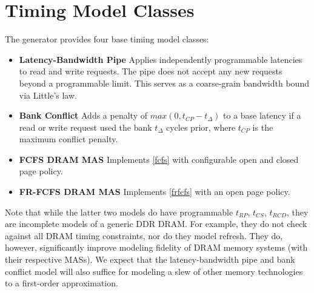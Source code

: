 \section{Timing Model Classes}\label{sec:timing_model}

The generator provides four base timing model classes:

\begin{itemize}
    \item \textbf{Latency-Bandwidth Pipe} Applies independently programmable
        latencies to read and write requests. The pipe does not accept any new
        requests beyond a programmable limit. This serves as a coarse-grain
        bandwidth bound via Little's law.

    \item \textbf{Bank Conflict} Adds a penalty of $max(0, t_{CP} -
        t_{\Delta})$ to a base latency if a read or write request used the bank
        $t_{\Delta}$ cycles prior, where $t_{CP}$ is the maximum conflict
        penalty.

    \item \textbf{FCFS DRAM MAS} Implements \ref{fcfs} with configurable open
        and closed page policy.

    \item \textbf{FR-FCFS DRAM MAS} Implements \ref{frfcfs} with an open page
        policy.
\end{itemize}


Note that while the latter two models do have programmable $t_{RP}$, $t_{CS}$,
$t_{RCD}$, they are incomplete models of a generic DDR DRAM. For example, they
do not check against all DRAM timing constraints, nor do they model refresh.
They do, however, significantly improve modeling fidelity of DRAM memory
systems (with their respective MASs). We expect that the latency-bandwidth pipe
and bank conflict model will also suffice for modeling a slew of other memory
technologies to a first-order approximation.

